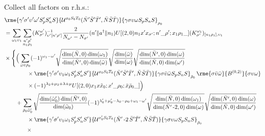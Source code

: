 \documentclass[%
  aps,%
  prc,%
  showpacs,%
  superscriptaddress,%
  onecolumn,%
  notitlepage,%
  11pt,%
  floatfix,%
  amsmath,%
  amssymb,%
]{revtex4-2}
\newcommand{\negative}{\,\text{-}}
\begin{document}
Collect all factors on r.h.s.:
\begin{align*}
  &
  \rme{\gamma'\sigma'\upsilon'\omega'S_p'S_n'S}{\mathcal{U}^{x_0 S_0 T_0}(\bar{N}'\bar{S}'\bar{T}',\bar{N}\bar{S}\bar{T})}{\gamma\sigma\upsilon\omega S_p S_n S}_{\rho_0}\\
  &=\sum_{\omega_1\upsilon_1} \sum_{\substack{n'\rho'\\n_1\rho_1}}(K_{\sigma'}^{\omega'})_{\upsilon'[n'\rho']}^{-1}\frac{2}{N_{\omega'} - N_{\sigma'}}(n'\Vert{}a^\dagger\Vert{}n_1) U[(2,0)n_1 x' x_{\sigma'};n'\_\rho';x_1\rho_1\_](K_{\sigma'}^{\omega_1})_{[n_1\rho_1],\upsilon_1}\\
  &\times\Bigg\{\Big(\sum_{\bar{\omega}\bar{\upsilon}\bar{\rho}_0}
      (-1)^{\omega_1-\omega'}
      \sqrt{\frac{\dim(\bar{N},0)\dim(\omega_1)}{\dim(\bar{N}',0)\dim(\bar{\omega})}}
      \sqrt{\frac{\dim(\bar{\omega})}{\dim(\omega)}}
      \sqrt{\frac{\dim(\bar{N}',0)\dim(\omega)}{\dim(\bar{N},0)\dim(\omega')}}
      \\
      & \qquad \qquad \times
      \rme{\gamma'\sigma'\upsilon_1\omega_1 S_p' S_n' S'}{\mathcal{U}^{x_0S_0T_0}(\bar{N}'\bar{S}'\bar{T}',\bar{N}\bar{S}\bar{T})}{\gamma \sigma \bar{\upsilon}\bar{\omega} S_p S_n S}_{\bar{\rho}_0} \, \rme{\sigma \bar{\upsilon}\bar{\omega}}{B^{(0,2)}}{\sigma \upsilon \omega}\\
  &\qquad\qquad\times
      (-1)^{\lambda_2+\mu_2+\lambda+\mu} U[(2,0) x_1 x \tilde{x}_0; x' \_ \rho_0; \bar{x}\bar{\rho}_0\_]
    \Big)\\
  &\qquad+\sum_{\bar{\rho}_0\tilde{\omega}_0'}
  \sqrt{\frac{\dim(\tilde{\omega}_0')\dim(\bar{N}',0)}{\dim(\tilde{\omega}_0)}}
  (-1)^{\lambda_0'+\mu_0'-\lambda_0-\mu_0+\omega_1-\omega'} \sqrt{\frac{\dim(\bar{N},0)\dim(\omega_1)}{\dim(\bar{N}'\negative2,0)\dim(\omega)}} \sqrt{\frac{\dim(\bar{N}',0)\dim(\omega)}{\dim(\bar{N},0)\dim(\omega')}}\\
  & \qquad \qquad \times
  \rme{\gamma'\sigma'\upsilon_1\omega_1 S_p' S_n' S'}{\mathcal{U}^{x_0'S_0T_0}(\bar{N}'\negative2\,\bar{S}'\bar{T}',\bar{N}\bar{S}\bar{T})}{\gamma \sigma \upsilon \omega S_p S_n S}_{\bar{\rho}_0}\\
  &\qquad\qquad\times

\end{align*}
\end{document}
